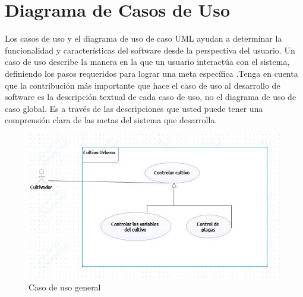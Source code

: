 \section{Diagrama de Casos de Uso}
Los casos de uso  y el diagrama de uso de caso UML ayudan a determinar la funcionalidad
y características del software desde la perspectiva del usuario. Un caso de uso describe la manera en la que un usuario interactúa con el sistema, definiendo
los pasos requeridos para lograr una meta específica .Tenga en cuenta que la contribución más importante que hace el caso de uso al desarrollo de software es la descripción textual de cada caso de uso, no el diagrama de uso de caso
global. Es a través de las descripciones que usted puede tener una comprensión clara
de las metas del sistema que desarrolla.\cite{pressman1988ingenieria}

\begin{figure}[h!]
	\centering
	\includegraphics[width=0.7\linewidth]{proyecto/imgs/CasoDeUso}
	\caption{Caso de uso general}
	\label{fig:casodeuso}
\end{figure}

